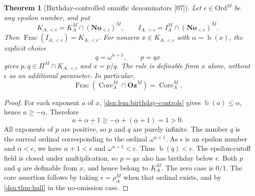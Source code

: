 \documentclass[11pt,a4paper]{article}
\numberwithin{equation}{section}
\newtheorem{theorem}{Theorem}[section]
\theoremstyle{definition}
\theoremstyle{remark}
\newcommand{\No}{\mathbf{No}}
\newcommand{\Oz}{\mathbf{Oz}}
\newcommand{\Ord}{\mathrm{Ord}}
\newcommand{\bd}{\operatorname{b}}
\newcommand{\Frac}{\operatorname{Frac}}
\newcommand{\Core}{\operatorname{Core}}
\newcommand{\src}[1]{\textup{\textsf{\small[#1]}}}
\begin{document}
\begin{theorem}[Birthday-controlled omnific denominators \src{07}]\label{dsn:thm:core-fractions}
Let $\epsilon\in\Ord^M$ be any epsilon number, and put
\[
 K_{A,<\epsilon}=K^M_A\cap(\No_{<\epsilon})^M,\qquad
 I_{A,<\epsilon}=I^M_A\cap(\No_{<\epsilon})^M.
\]
Then $\Frac(I_{A,<\epsilon})=K_{A,<\epsilon}$. For nonzero
$x\in K_{A,<\epsilon}$ with $\alpha=\bd(x)$, the explicit choice
\begin{equation}\label{dsn:eq:ordinal-denominator}
 q=\omega^{\underline{\alpha+1}},\qquad p=qx
\end{equation}
gives $p,q\in\Pi^M\cap K_{A,<\epsilon}$ and $x=p/q$. The rule is definable
from $x$ alone, without $\epsilon$ as an additional parameter. In
particular,
\[
 \Frac(\Core^M_A\cap\Oz^M)=\Core^M_A.
\]
\end{theorem}
\begin{proof}
For each exponent $a$ of $x$, \cref{dsn:lem:birthday-controls} gives
$\bd(a)\le\alpha$, hence $a\ge-\underline\alpha$. Therefore
\[
 a+\underline{\alpha+1}\ge
 -\underline\alpha+(\underline\alpha+1)=1>0.
\]
All exponents of $p$ are positive, so $p$ and $q$ are purely infinite. The
number $q$ is the surreal ordinal corresponding to the ordinal
$\omega^{\alpha+1}$. As $\epsilon$ is an epsilon number and
$\alpha<\epsilon$, we have $\alpha+1<\epsilon$ and
$\omega^{\alpha+1}<\epsilon$. Thus $\bd(q)<\epsilon$. The epsilon-cutoff
field is closed under multiplication, so $p=qx$ also has birthday below
$\epsilon$. Both $p$ and $q$ are definable from $x$, and hence belong to
$K^M_A$. The zero case is $0/1$. The core assertion follows by taking
$\epsilon=\rho^M_A$ when that ordinal exists, and by \cref{dsn:thm:hull}
in the no-omission case.
\end{proof}
\end{document}
